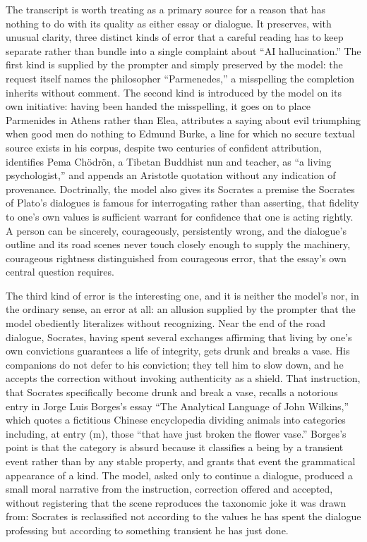 \documentclass[11pt]{article}
\begin{document}
The transcript is worth treating as a primary source for a reason that has nothing to do with its quality as either essay or dialogue. It preserves, with unusual clarity, three distinct kinds of error that a careful reading has to keep separate rather than bundle into a single complaint about ``AI hallucination.'' The first kind is supplied by the prompter and simply preserved by the model: the request itself names the philosopher ``Parmenedes,'' a misspelling the completion inherits without comment. The second kind is introduced by the model on its own initiative: having been handed the misspelling, it goes on to place Parmenides in Athens rather than Elea, attributes a saying about evil triumphing when good men do nothing to Edmund Burke, a line for which no secure textual source exists in his corpus, despite two centuries of confident attribution, identifies Pema Ch\"odr\"on, a Tibetan Buddhist nun and teacher, as ``a living psychologist,'' and appends an Aristotle quotation without any indication of provenance. Doctrinally, the model also gives its Socrates a premise the Socrates of Plato's dialogues is famous for interrogating rather than asserting, that fidelity to one's own values is sufficient warrant for confidence that one is acting rightly. A person can be sincerely, courageously, persistently wrong, and the dialogue's outline and its road scenes never touch closely enough to supply the machinery, courageous rightness distinguished from courageous error, that the essay's own central question requires.

The third kind of error is the interesting one, and it is neither the model's nor, in the ordinary sense, an error at all: an allusion supplied by the prompter that the model obediently literalizes without recognizing. Near the end of the road dialogue, Socrates, having spent several exchanges affirming that living by one's own convictions guarantees a life of integrity, gets drunk and breaks a vase. His companions do not defer to his conviction; they tell him to slow down, and he accepts the correction without invoking authenticity as a shield. That instruction, that Socrates specifically become drunk and break a vase, recalls a notorious entry in Jorge Luis Borges's essay ``The Analytical Language of John Wilkins,'' which quotes a fictitious Chinese encyclopedia dividing animals into categories including, at entry (m), those ``that have just broken the flower vase.'' Borges's point is that the category is absurd because it classifies a being by a transient event rather than by any stable property, and grants that event the grammatical appearance of a kind. The model, asked only to continue a dialogue, produced a small moral narrative from the instruction, correction offered and accepted, without registering that the scene reproduces the taxonomic joke it was drawn from: Socrates is reclassified not according to the values he has spent the dialogue professing but according to something transient he has just done.
\end{document}
